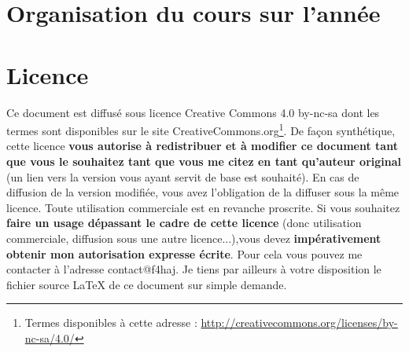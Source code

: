 \documentclass[a4paper,12pt,oneside]{report} %
\begin{document}

	
	\section{Organisation du cours sur l'année}
	
	

	\section{Licence}
	Ce document est diffusé sous licence Creative Commons 4.0 by-nc-sa dont les termes sont disponibles sur le site CreativeCommons.org\footnote{Termes disponibles à cette adresse : \url{http://creativecommons.org/licenses/by-nc-sa/4.0/}}. De façon synthétique, cette licence \textbf{vous autorise à redistribuer et à modifier ce document tant que vous le souhaitez tant que vous me citez en tant qu'auteur original} (un lien vers la version vous ayant servit de base est souhaité). En cas de diffusion de la version modifiée, vous avez l'obligation de la diffuser sous la même licence. Toute utilisation commerciale est en revanche proscrite. Si vous souhaitez \textbf{faire un usage dépassant le cadre de cette licence} (donc utilisation commerciale, diffusion sous une autre licence...),vous devez \textbf{impérativement obtenir mon autorisation expresse écrite}. Pour cela vous pouvez me contacter à l'adresse contact@f4haj. Je tiens par ailleurs à votre disposition le fichier source \LaTeX{} de ce document sur simple demande.
	
\end{document}
